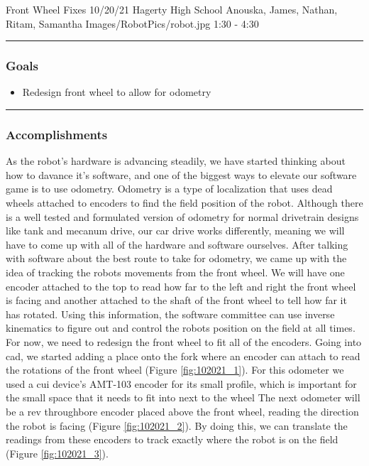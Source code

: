 \insertmeeting 
	{Front Wheel Fixes} 
	{10/20/21}
	{Hagerty High School}
	{Anouska, James, Nathan, Ritam, Samantha}
	{Images/RobotPics/robot.jpg}
	{1:30 - 4:30}
	
\noindent\hfil\rule{\textwidth}{.4pt}\hfil
\subsubsection*{Goals}
\begin{itemize}
    \item Redesign front wheel to allow for odometry 

\end{itemize} 

\noindent\hfil\rule{\textwidth}{.4pt}\hfil

\subsubsection*{Accomplishments}
As the robot’s hardware is advancing steadily, we have started thinking about how to davance it’s software, and one of the biggest ways to elevate our software game is to use odometry. Odometry is a type of localization that uses dead wheels attached to encoders to find the field position of the robot. Although there is a well tested and formulated version of odometry for normal drivetrain designs like tank and mecanum drive, our car drive works differently, meaning we will have to come up with all of the hardware and software ourselves. After talking with software about the best route to take for odometry, we came up with the idea of tracking the robots movements from the front wheel. We will have one encoder attached to the top to read how far to the left and right the front wheel is facing and another attached to the shaft of the front wheel to tell how far it has rotated. Using this information, the software committee can use inverse kinematics to figure out and control the robots position on the field at all times. For now, we need to redesign the front wheel to fit all of the encoders. Going into cad, we started adding a place onto the fork where an encoder can attach to read the rotations of the front wheel (Figure \ref{fig:102021_1}). For this odometer we used a cui device's AMT-103 encoder for its small profile, which is important for the small space that it needs to fit into next to the wheel The next odometer will be a rev throughbore encoder placed above the front wheel, reading the direction the robot is facing (Figure \ref{fig:102021_2}). By doing this, we can translate the readings from these encoders to track exactly where the robot is on the field (Figure \ref{fig:102021_3}). 

